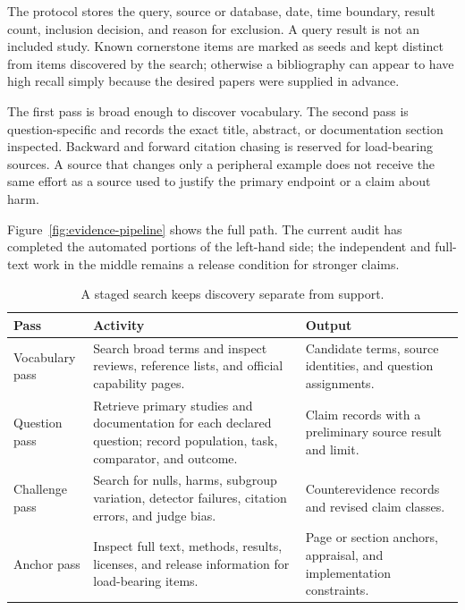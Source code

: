 The protocol stores the query, source or database, date, time boundary, result
count, inclusion decision, and reason for exclusion. A query result is not an
included study. Known cornerstone items are marked as seeds and kept distinct
from items discovered by the search; otherwise a bibliography can appear to
have high recall simply because the desired papers were supplied in advance.

The first pass is broad enough to discover vocabulary. The second pass is
question-specific and records the exact title, abstract, or documentation
section inspected. Backward and forward citation chasing is reserved for
load-bearing sources. A source that changes only a peripheral example does not
receive the same effort as a source used to justify the primary endpoint or a
claim about harm.

Figure~\ref{fig:evidence-pipeline} shows the full path. The current audit has
completed the automated portions of the left-hand side; the independent and
full-text work in the middle remains a release condition for stronger claims.

\hvFigureEvidencePipeline

\begin{table}[H]
\centering
\small
\begin{tabularx}{\textwidth}{@{}p{}p{}L@{}}
\toprule
Pass & Activity & Output \\
\midrule
Vocabulary pass & Search broad terms and inspect reviews, reference lists,
and official capability pages. & Candidate terms, source identities, and
question assignments. \\
Question pass & Retrieve primary studies and documentation for each declared
question; record population, task, comparator, and outcome. & Claim records
with a preliminary source result and limit. \\
Challenge pass & Search for nulls, harms, subgroup variation, detector
failures, citation errors, and judge bias. & Counterevidence records and
revised claim classes. \\
Anchor pass & Inspect full text, methods, results, licenses, and release
information for load-bearing items. & Page or section anchors, appraisal, and
implementation constraints. \\
\bottomrule
\end{tabularx}
\caption{A staged search keeps discovery separate from support.}
\label{tab:method-passes}
\end{table}

